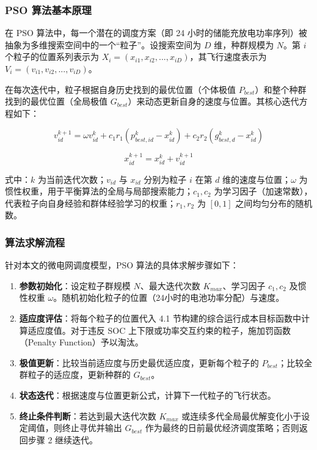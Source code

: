\subsubsection{PSO 算法基本原理}
在 PSO 算法中，每一个潜在的调度方案（即 24 小时的储能充放电功率序列）被抽象为多维搜索空间中的一个“粒子”。设搜索空间为 $D$ 维，种群规模为 $N$。第 $i$ 个粒子的位置系列表示为 $X_i = (x_{i1}, x_{i2}, ..., x_{iD})$，其飞行速度表示为 $V_i = (v_{i1}, v_{i2}, ..., v_{iD})$。

在每次迭代中，粒子根据自身历史找到的最优位置（个体极值 $P_{best}$）和整个种群找到的最优位置（全局极值 $G_{best}$）来动态更新自身的速度与位置。其核心迭代方程如下：

\begin{equation}
    v_{id}^{k+1} = \omega v_{id}^k + c_1 r_1 (p_{best,id}^k - x_{id}^k) + c_2 r_2 (g_{best,d}^k - x_{id}^k)
\end{equation}

\begin{equation}
    x_{id}^{k+1} = x_{id}^k + v_{id}^{k+1}
\end{equation}

式中：$k$ 为当前迭代次数；$v_{id}$ 与 $x_{id}$ 分别为粒子 $i$ 在第 $d$ 维的速度与位置；$\omega$ 为惯性权重，用于平衡算法的全局与局部搜索能力；$c_1, c_2$ 为学习因子（加速常数），代表粒子向自身经验和群体经验学习的权重；$r_1, r_2$ 为 $[0,1]$ 之间均匀分布的随机数。

\subsubsection{算法求解流程}
针对本文的微电网调度模型，PSO 算法的具体求解步骤如下：
\begin{enumerate}
    \item \textbf{参数初始化}：设定粒子群规模 $N$、最大迭代次数 $K_{max}$、学习因子 $c_1, c_2$ 及惯性权重 $\omega$。随机初始化粒子的位置（24小时的电池功率分配）与速度。
    \item \textbf{适应度评估}：将每个粒子的位置代入 4.1 节构建的综合运行成本目标函数中计算适应度值。对于违反 SOC 上下限或功率交互约束的粒子，施加罚函数（Penalty Function）予以淘汰。
    \item \textbf{极值更新}：比较当前适应度与历史最优适应度，更新每个粒子的 $P_{best}$；比较全群粒子的适应度，更新种群的 $G_{best}$。
    \item \textbf{状态迭代}：根据速度与位置更新公式，计算下一代粒子的飞行状态。
    \item \textbf{终止条件判断}：若达到最大迭代次数 $K_{max}$ 或连续多代全局最优解变化小于设定阈值，则终止寻优并输出 $G_{best}$ 作为最终的日前最优经济调度策略；否则返回步骤 2 继续迭代。
\end{enumerate}

